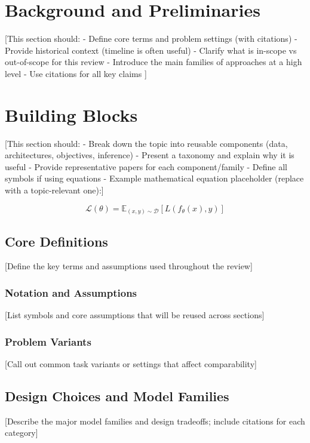 \documentclass[conference]{IEEEtran}
\begin{document}
\section{Background and Preliminaries}
[This section should:
- Define core terms and problem settings (with citations)
- Provide historical context (timeline is often useful)
- Clarify what is in-scope vs out-of-scope for this review
- Introduce the main families of approaches at a high level
- Use citations for all key claims \cite{smith2022deep}]

\section{Building Blocks}
[This section should:
- Break down the topic into reusable components (data, architectures, objectives, inference)
- Present a taxonomy and explain why it is useful
- Provide representative papers for each component/family
- Define all symbols if using equations
- Example mathematical equation placeholder (replace with a topic-relevant one):]

\begin{equation}
    \mathcal{L}(\theta) = \mathbb{E}_{(x,y) \sim \mathcal{D}} [L(f_\theta(x), y)]
\end{equation}

\subsection{Core Definitions}
[Define the key terms and assumptions used throughout the review]

\subsubsection{Notation and Assumptions}
[List symbols and core assumptions that will be reused across sections]

\subsubsection{Problem Variants}
[Call out common task variants or settings that affect comparability]

\subsection{Design Choices and Model Families}
[Describe the major model families and design tradeoffs; include citations for each category]
\end{document}
